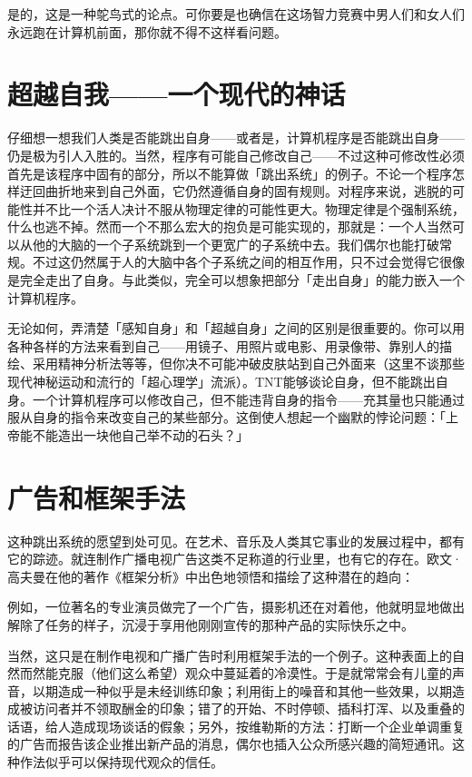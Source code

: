 \documentclass[
  12pt,
  twoside,
  openright,
  oldfontcommands,
]{memoir}
\newenvironment{fsquote}{%
  \begin{mdframed}[style=gebquote]\kaitifamily\small%
}{%
  \end{mdframed}%
}
\begin{document}
是的，这是一种鸵鸟式的论点。可你要是也确信在这场智力竞赛中男人们和女人们永远跑在计算机前面，那你就不得不这样看问题。

\section{超越自我------一个现代的神话}

仔细想一想我们人类是否能跳出自身------或者是，计算机程序是否能跳出自身------仍是极为引人入胜的。当然，程序有可能自己修改自己------不过这种可修改性必须首先是该程序中固有的部分，所以不能算做「跳出系统」的例子。不论一个程序怎样迂回曲折地来到自己外面，它仍然遵循自身的固有规则。对程序来说，逃脱的可能性并不比一个活人决计不服从物理定律的可能性更大。物理定律是个强制系统，什么也逃不掉。然而一个不那么宏大的抱负是可能实现的，那就是：一个人当然可以从他的大脑的一个子系统跳到一个更宽广的子系统中去。我们偶尔也能打破常规。不过这仍然属于人的大脑中各个子系统之间的相互作用，只不过会觉得它很像是完全走出了自身。与此类似，完全可以想象把部分「走出自身」的能力嵌入一个计算机程序。

无论如何，弄清楚「感知自身」和「超越自身」之间的区别是很重要的。你可以用各种各样的方法来看到自己------用镜子、用照片或电影、用录像带、靠别人的描绘、采用精神分析法等等，但你决不可能冲破皮肤站到自己外面来（这里不谈那些现代神秘运动和流行的「超心理学」流派）。TNT能够谈论自身，但不能跳出自身。一个计算机程序可以修改自己，但不能违背自身的指令------充其量也只能通过服从自身的指令来改变自己的某些部分。这倒使人想起一个幽默的悖论问题：「上帝能不能造出一块他自己举不动的石头？」

\section{广告和框架手法}

这种跳出系统的愿望到处可见。在艺术、音乐及人类其它事业的发展过程中，都有它的踪迹。就连制作广播电视广告这类不足称道的行业里，也有它的存在。欧文·高夫曼在他的著作《框架分析》中出色地领悟和描绘了这种潜在的趋向：

\begin{fsquote}
例如，一位著名的专业演员做完了一个广告，摄影机还在对着他，他就明显地做出解除了任务的样子，沉浸于享用他刚刚宣传的那种产品的实际快乐之中。
\end{fsquote}

\begin{fsquote}
当然，这只是在制作电视和广播广告时利用框架手法的一个例子。这种表面上的自然而然能克服（他们这么希望）观众中蔓延着的冷漠性。于是就常常会有儿童的声音，以期造成一种似乎是未经训练印象；利用街上的噪音和其他一些效果，以期造成被访问者并不领取酬金的印象；错了的开始、不时停顿、插科打浑、以及重叠的话语，给人造成现场谈话的假象；另外，按维勒斯的方法：打断一个企业单调重复的广告而报告该企业推出新产品的消息，偶尔也插入公众所感兴趣的简短通讯。这种作法似乎可以保持现代观众的信任。
\end{fsquote}
\end{document}
